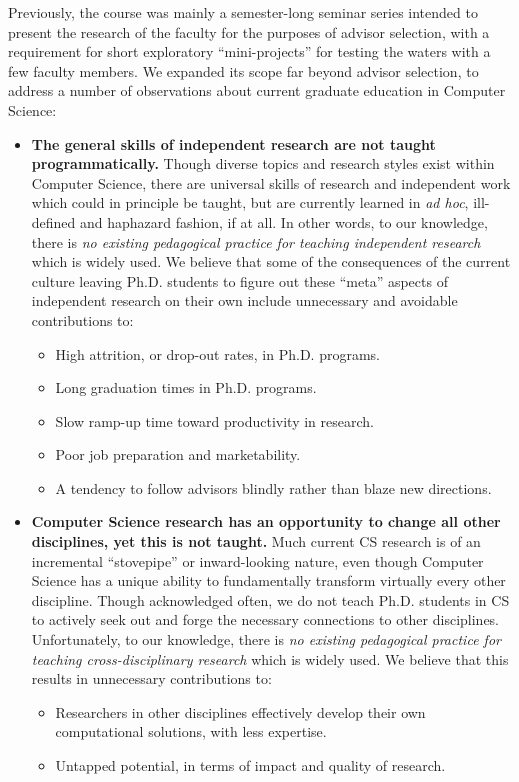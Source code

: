 Previously, the course was mainly a semester-long seminar series
intended to present the research of the faculty for
the purposes of advisor selection, with a requirement for short
exploratory ``mini-projects'' for testing the waters with a few faculty
members.  We expanded its scope far beyond advisor selection, to
address a number of observations about current graduate education in
Computer Science:
\begin{itemize}

\item {\bf The general skills of independent research are not taught
programmatically.}  Though diverse topics and research styles exist
within Computer Science, there are universal skills of research and
independent work which could in principle be taught, but are currently
learned in {\it ad hoc}, ill-defined and haphazard fashion, if at all.
In other words, to our knowledge, there is {\it no existing
pedagogical practice for teaching independent research} which is widely
used.
We believe that some of the consequences of the current culture
leaving Ph.D. students to figure out these ``meta'' aspects of
independent research on their own include unnecessary and avoidable
contributions to:
  \begin{itemize}
\itemsep=-1pt
  \item High attrition, or drop-out rates, in Ph.D. programs.
  \item Long graduation times in Ph.D. programs.
  \item Slow ramp-up time toward productivity in research.
  \item Poor job preparation and marketability.
  \item A tendency to follow advisors blindly rather than blaze new directions.
  \end{itemize}

\item {\bf Computer Science research has an opportunity to change all
other disciplines, yet this is not taught.}  Much current CS
research is of an incremental ``stovepipe'' or inward-looking
nature, even though Computer Science has a unique ability to
fundamentally transform virtually every other discipline.  Though
acknowledged often, we do not teach Ph.D. students in CS to actively
seek out and forge the necessary connections to other disciplines.
Unfortunately, to our knowledge, there is {\it no existing
pedagogical practice for teaching cross-disciplinary research} which is
widely used.  We believe that this results in unnecessary contributions to:
  \begin{itemize}
\itemsep=-1pt
  \item Researchers in other disciplines effectively develop their own
        computational solutions, with less expertise.
  \item Untapped potential, in terms of impact and quality of research.
  \end{itemize}


\end{itemize}
